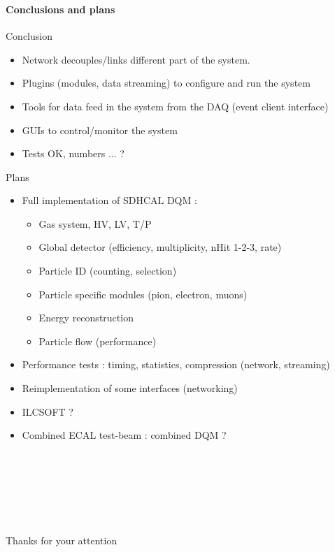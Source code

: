 \documentclass[8pt]{beamer}
\begin{document}
  
  \begin{frame}
  \frametitle{\secname}
  \framesubtitle{Conclusions and plans}

  \begin{block}{Conclusion}
    \begin{itemize}
      \item Network decouples/links different part of the system.
      \item Plugins (modules, data streaming) to configure and run the system 
      \item Tools for data feed in the system from the DAQ (event client interface)
      \item GUIs to control/monitor the system
      \item Tests OK, numbers ... ?
    \end{itemize}
  \end{block}
  
  \begin{block}{Plans}
    \begin{itemize}
      \item Full implementation of SDHCAL DQM :
      \begin{itemize}
        \item Gas system, HV, LV, T/P
        \item Global detector (efficiency, multiplicity, nHit 1-2-3, rate)
        \item Particle ID (counting, selection)
        \item Particle specific modules (pion, electron, muons)
        \item Energy reconstruction
        \item Particle flow (performance)
      \end{itemize}
      \item Performance tests : timing, statistics, compression (network, streaming)
      \item Reimplementation of some interfaces (networking)
      \item ILCSOFT ?
      \item Combined ECAL test-beam : combined DQM ? 
    \end{itemize}
  \end{block}
  
  \end{frame}
  
  
 
  \begin{frame}
  
  ~ \\
  ~ \\
  ~ \\
  ~ \\
  ~ \\
  ~ \\
    \centering \large Thanks for your attention
  ~ \\
  ~ \\
  ~ \\
  
    
  \end{frame}
\end{document}
